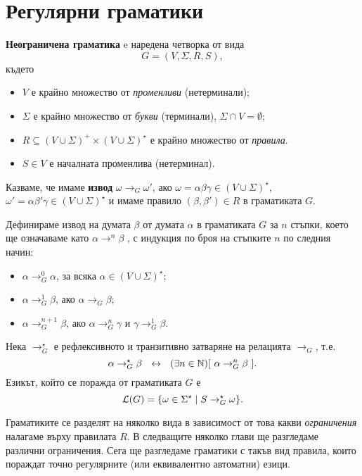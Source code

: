 \section{Регулярни граматики}
\label{sect:regular-grammar}
{\bf Неограничена граматика} e наредена четворка от вида
\[G = (V, \Sigma, R, S),\]
където
\begin{itemize}
\item
  $V$ е крайно множество от {\em променливи} (нетерминали);
\item
  $\Sigma$ е крайно множество от {\em букви} (терминали), $\Sigma \cap V = \emptyset$;
\item
  $R \subseteq (V\cup\Sigma)^+ \times (V \cup \Sigma)^\star$ е крайно множество от {\em правила}.
\item
  $S \in V$ е началната променлива (нетерминал). 
\end{itemize}
Казваме, че имаме {\bf извод} $\omega \to_G \omega'$, ако $\omega = \alpha\beta\gamma \in (V\cup\Sigma)^\star$,
$\omega' = \alpha\beta'\gamma \in (V\cup\Sigma)^\star$ и имаме правило $(\beta,\beta') \in R$ в граматиката $G$.

Дефинираме извод на думата $\beta$ от думата $\alpha$ в граматиката $G$ за $n$ стъпки, което ще означаваме като $\alpha\to^n\beta$ , с индукция по броя
на стъпките $n$ по следния начин:
\begin{itemize}
\item
  $\alpha \to^0_G \alpha$, за всяка $\alpha \in (V \cup \Sigma)^\star$;
\item
  $\alpha \to^1_G \beta$, ако $\alpha \to_G \beta$;
\item
  $\alpha \to^{n+1}_G \beta$, ако $\alpha \to^n_G \gamma$ и $\gamma \to^1_G \beta$.
\end{itemize}
Нека $\to^\star_G$ е рефлексивното и транзитивно затваряне на релацията $\to_G$, т.е.
\[ \alpha \to^\star_G \beta\ \iff\ (\exists n\in\Nat)[\ \alpha \to^n_G \beta\ ].\]
Езикът, който се поражда от граматиката $G$ е
\[\mathcal{L}(G) = \{\omega \in \Sigma^\star \mid S \to^\star_G \omega\}.\]

Граматиките се разделят на няколко вида в зависимост от това какви {\em ограничения} налагаме върху правилата $R$.
В следващите няколко глави ще разгледаме различни ограничения. Сега ще разгледаме граматики с такъв вид правила,
които пораждат точно регулярните (или еквивалентно автоматни) езици.

